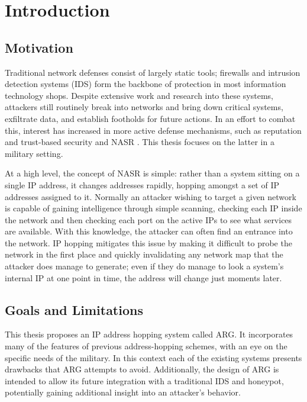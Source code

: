 \chapter{Introduction}
\label{chp:introduction}

\section{Motivation}
\par Traditional network defenses consist of largely static tools; firewalls and intrusion detection systems (IDS) form the backbone of protection in most information technology shops. Despite extensive work and research into these systems, attackers still routinely break into networks and bring down critical systems, exfiltrate data, and establish footholds for future actions. In an effort to combat this, interest has increased in more active defense mechanisms, such as reputation and trust-based security \cite{Untrustworthiness} and \ac{NASR} \cite{APOD, NAH}. This thesis focuses on the latter in a military setting.

\par At a high level, the concept of \ac{NASR} is simple: rather than a system sitting on a single \ac{IP} address, it changes addresses rapidly, hopping amongst a set of \ac{IP} addresses assigned to it. Normally an attacker wishing to target a given network is capable of gaining intelligence through simple scanning, checking each IP inside the network and then checking each port on the active IPs to see what services are available. With this knowledge, the attacker can often find an entrance into the network. IP hopping mitigates this issue by making it difficult to probe the network in the first place and quickly invalidating any network map that the attacker does manage to generate; even if they do manage to look a system's internal IP at one point in time, the address will change just moments later.

\section{Goals and Limitations}
\par This thesis proposes an IP address hopping system called \ac{ARG}. It incorporates many of the features of previous address-hopping schemes, with an eye on the specific needs of the military. In this context each of the existing systems presents drawbacks that \ac{ARG} attempts to avoid. Additionally, the design of ARG is intended to allow its future integration with a traditional IDS and honeypot, potentially gaining additional insight into an attacker's behavior.


